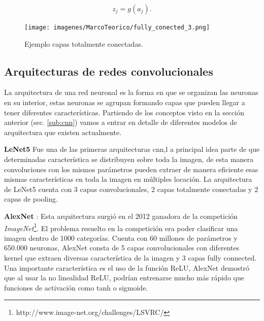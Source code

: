 \begin{equation}\label{eq:output-fully-conected}
z_j = g(a_j).
\end{equation}


\begin{figure}[H]
 \centering
  \texttt{[image: imagenes/MarcoTeorico/fully\_conected\_3.png]}
  \caption{Ejemplo capas totalmente conectadas.} 
  \label{Fig:relu}
\end{figure}


\subsection{Arquitecturas de redes convolucionales}\label{sub:arquitecturacnn}
La arquitectura de una red neuronal es la forma en que se organizan  las neuronas en su interior, estas neuronas se agrupan formando capas que pueden llegar a tener diferentes características. Partiendo de los conceptos visto en la sección anterior (sec. \ref{sub:cnn})  vamos a entrar en detalle de diferentes modelos de arquitectura que existen actualmente.

\par \textbf{LeNet5} \citep{lenet} Fue una de las primeras arquitecturas \ac{cnn},l a principal idea parte de que determinadas característica se distribuyen sobre toda la imagen, de esta manera convoluciones con los mismos parámetros pueden extraer de manera eficiente esas mismas características en toda la imagen en múltiples locación. La arquitectura de LeNet5 cuenta con 3 capas convolucionales, 2 capas totalmente conectadas y 2 capas de pooling.

\par \textbf{AlexNet} \citep{alexnet}: Esta arquitectura surgió en el 2012 ganadora de la competición \textit{ImageNet}\footnote{http://www.image-net.org/challenges/LSVRC/}. El problema resuelto en la competición era poder clasificar una imagen dentro de 1000 categorías. Cuenta con 60 millones de parámetros y 650.000 neuronas, AlexNet consta de 5 capas convolucionales con diferentes kernel que extraen diversas característica de la imagen  y 3 capas fully connected. Una importante característica es el uso de la función ReLU,  AlexNet demostró que al usar la no linealidad ReLU,  podrían entrenarse mucho más rápido que  funciones de activación como  tanh o sigmoide.


